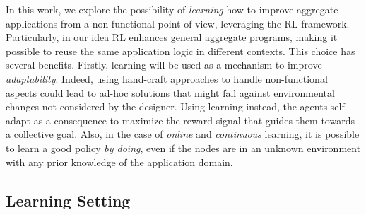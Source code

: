 In this work, we explore the possibility of \emph{learning} 
 how to improve aggregate applications from a non-functional point of view, 
 leveraging the \ac{RL} framework.
%
%
Particularly, in our idea \ac{RL} enhances general aggregate programs, 
 making it possible to reuse the same application logic in different contexts.
%
This choice has several benefits.
 Firstly, learning will be used as a mechanism to improve \emph{adaptability}. 
 Indeed, using hand-craft approaches to handle non-functional aspects 
 could lead to ad-hoc solutions that might fail against environmental 
 changes not considered by the designer.
%
Using learning instead, the agents self-adapt as a consequence 
 to maximize the reward signal that guides them towards a collective goal. 
%
Also, in the case of \emph{online} and \emph{continuous} learning, 
 it is possible to learn a good policy \emph{by doing}, 
 even if the nodes are in an unknown environment with any prior knowledge of the application domain.
%

\subsection{Learning Setting}\label{sec:learning-setting}

